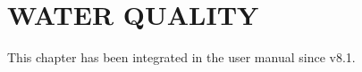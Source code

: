 \chapter{WATER QUALITY}
\label{ch:wat:qual}

This chapter has been integrated in the \waqtel user manual since v8.1.
